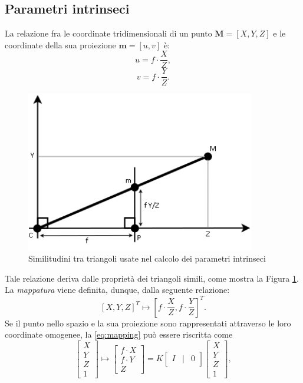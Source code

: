 \subsection{Parametri intrinseci}
\label{intrinsicParam}
La relazione fra le coordinate tridimensionali di un punto $\textbf{M}=[X,Y,Z]$ e le coordinate della sua proiezione $\textbf{m}=[u,v]$ \`e:
\[u=f\cdot \frac{X}{Z},\]
\[v=f\cdot \frac{Y}{Z}.\]
\begin{figure}[tb]
	\centering
	\includegraphics[width=10cm]{./pictures/mappatura2d3d}
	\caption{Similitudini tra triangoli usate nel calcolo dei parametri intrinseci}
	\label{fig:mapping}
\end{figure}
\noindent Tale relazione deriva dalle propriet\`a dei triangoli simili, come mostra la Figura \ref{fig:mapping}.
La \textit{mappatura} viene definita, dunque, dalla seguente relazione:
\begin{equation}
\label{eq:mapping}
[X,Y,Z]^\textit{T} \mapsto \left[f\cdot \frac{X}{Z}, f\cdot \frac{Y}{Z}\right]^\textit{T}.
\end{equation} 
Se il punto nello spazio e la sua proiezione sono rappresentati attraverso le loro coordinate omogenee, la \eqref{eq:mapping} pu\`o essere riscritta come
\begin{equation}
\label{eq:mappingMatrix}
\left[\begin{array}{c}
X \\ Y \\ Z \\ 1
\end{array}\right] \mapsto 
\left[\begin{array}{c}
f \cdot X \\ f \cdot Y \\ Z
\end{array}\right] = 
K \left[\begin{array}{rcl}
I & | & 0
\end{array}\right]
\left[\begin{array}{c}
X \\ Y \\ Z \\ 1
\end{array}\right],
\end{equation}

